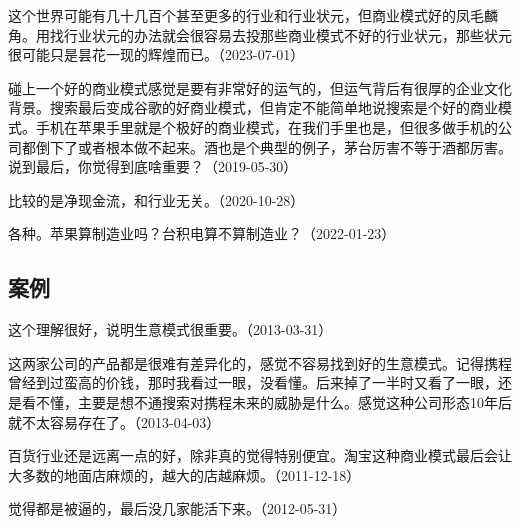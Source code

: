 这个世界可能有几十几百个甚至更多的行业和行业状元，但商业模式好的凤毛麟角。用找行业状元的办法就会很容易去投那些商业模式不好的行业状元，那些状元很可能只是昙花一现的辉煌而已。（2023-07-01）

碰上一个好的商业模式感觉是要有非常好的运气的，但运气背后有很厚的企业文化背景。搜索最后变成谷歌的好商业模式，但肯定不能简单地说搜索是个好的商业模式。手机在苹果手里就是个极好的商业模式，在我们手里也是，但很多做手机的公司都倒下了或者根本做不起来。酒也是个典型的例子，茅台厉害不等于酒都厉害。说到最后，你觉得到底啥重要？（2019-05-30）


比较的是净现金流，和行业无关。（2020-10-28）


各种。苹果算制造业吗？台积电算不算制造业？（2022-01-23）

\subsection{案例}


这个理解很好，说明生意模式很重要。（2013-03-31）

这两家公司的产品都是很难有差异化的，感觉不容易找到好的生意模式。记得携程曾经到过蛮高的价钱，那时我看过一眼，没看懂。后来掉了一半时又看了一眼，还是看不懂，主要是想不通搜索对携程未来的威胁是什么。感觉这种公司形态10年后就不太容易存在了。（2013-04-03）


百货行业还是远离一点的好，除非真的觉得特别便宜。淘宝这种商业模式最后会让大多数的地面店麻烦的，越大的店越麻烦。（2011-12-18）


觉得都是被逼的，最后没几家能活下来。（2012-05-31）


